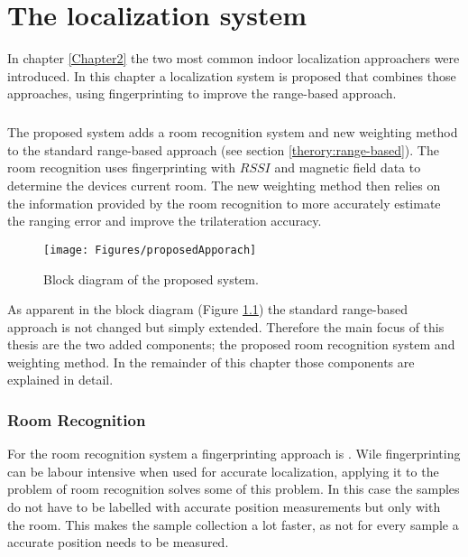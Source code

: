 \chapter{The localization system}

\label{Chapter3}

In chapter \ref{Chapter2} the two most common indoor localization approachers were introduced. In this chapter a localization system is proposed that combines those approaches, using fingerprinting to improve the range-based approach.

\paragraph{}The proposed system adds a room recognition system and new weighting method to the standard range-based approach (see section \ref{therory:range-based}). The room recognition uses fingerprinting with $RSSI$ and magnetic field data to determine the devices current room. The new weighting method then relies on the information provided by the room recognition to more accurately estimate the ranging error and improve the trilateration accuracy.

\begin{figure}[ht]
\centering
\texttt{[image: Figures/proposedApporach]}
\decoRule
\caption[The proposed approach]{Block diagram of the proposed system.}
\label{fig:proposedApproach}
\end{figure}

As apparent in the block diagram (Figure \ref{fig:proposedApproach}) the standard range-based approach is not changed but simply extended. Therefore the main focus of this thesis are the two added components; the proposed room recognition system and weighting method. In the remainder of this chapter those components are explained in detail. 

\subsection{Room Recognition}
For the room recognition system a fingerprinting approach is . Wile fingerprinting can be labour intensive when used for accurate localization, applying it to the problem of room recognition solves some of this problem. In this case the samples do not have to be labelled with accurate position measurements but only with the room. This makes the sample collection a lot faster, as not for every sample a accurate position needs to be measured.

